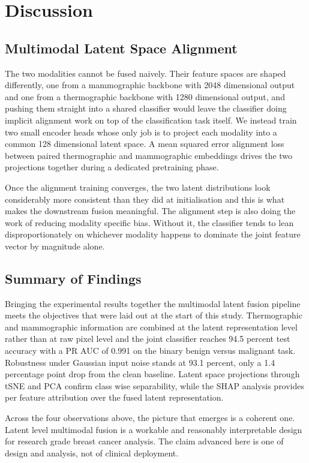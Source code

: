 \documentclass[lettersize,journal]{IEEEtran}
\begin{document}
\section{Discussion}

\subsection{Multimodal Latent Space Alignment}
The two modalities cannot be fused naively. Their feature spaces are shaped differently, one from a mammographic backbone with 2048 dimensional output and one from a thermographic backbone with 1280 dimensional output, and pushing them straight into a shared classifier would leave the classifier doing implicit alignment work on top of the classification task itself. We instead train two small encoder heads whose only job is to project each modality into a common 128 dimensional latent space. A mean squared error alignment loss between paired thermographic and mammographic embeddings drives the two projections together during a dedicated pretraining phase.

Once the alignment training converges, the two latent distributions look considerably more consistent than they did at initialisation and this is what makes the downstream fusion meaningful. The alignment step is also doing the work of reducing modality specific bias. Without it, the classifier tends to lean disproportionately on whichever modality happens to dominate the joint feature vector by magnitude alone.

\subsection{Summary of Findings}
Bringing the experimental results together the multimodal latent fusion pipeline meets the objectives that were laid out at the start of this study. Thermographic and mammographic information are combined at the latent representation level rather than at raw pixel level and the joint classifier reaches 94.5 percent test accuracy with a PR AUC of 0.991 on the binary benign versus malignant task. Robustness under Gaussian input noise stands at 93.1 percent, only a 1.4 percentage point drop from the clean baseline. Latent space projections through t\textendash SNE and PCA confirm class wise separability, while the SHAP analysis provides per feature attribution over the fused latent representation.

Across the four observations above, the picture that emerges is a coherent one. Latent level multimodal fusion is a workable and reasonably interpretable design for research grade breast cancer analysis. The claim advanced here is one of design and analysis, not of clinical deployment.
\end{document}
